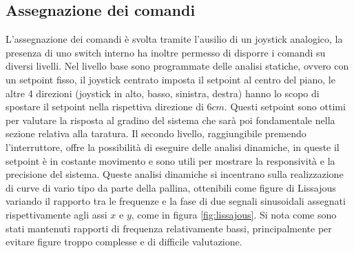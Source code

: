 \documentclass[12pt,twoside,openright]{report}
\begin{document}
\subsection{Assegnazione dei comandi}\label{assegnazionecomandi}
L'assegnazione dei comandi è svolta tramite l'ausilio di un joystick analogico, la presenza di uno switch interno ha inoltre permesso di disporre i comandi su diversi livelli. Nel livello base sono programmate delle analisi statiche, ovvero con un setpoint fisso, il joystick centrato imposta il setpoint al centro del piano, le altre 4 direzioni (joystick in alto, basso, sinistra, destra) hanno lo scopo di spostare il setpoint nella rispettiva direzione di $6cm$. Questi setpoint sono ottimi per valutare la risposta al gradino del sistema che sarà poi fondamentale nella sezione relativa alla taratura. Il secondo livello, raggiungibile premendo l'interruttore, offre la possibilità di eseguire delle analisi dinamiche, in queste il setpoint è in costante movimento e sono utili per mostrare la responsività e la precisione del sistema. Queste analisi dinamiche si incentrano sulla realizzazione di curve di vario tipo da parte della pallina, ottenibili come figure di Lissajous variando il rapporto tra le frequenze e la fase di due segnali sinusoidali assegnati rispettivamente agli assi $x$ e $y$, come in figura \ref{fig:lissajous}. Si nota come sono stati mantenuti rapporti di frequenza relativamente bassi, principalmente per evitare figure troppo complesse e di difficile valutazione.
\end{document}
